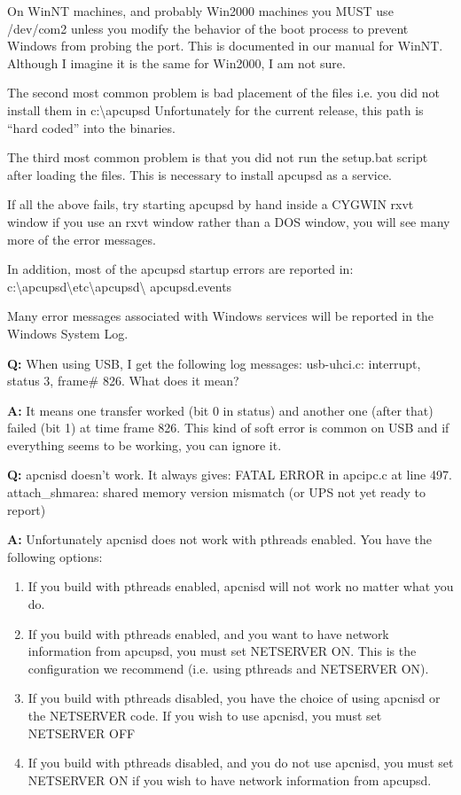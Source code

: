 {{{{{{{{{\begin{description}
{{{On WinNT machines, and probably Win2000 machines you MUST use /dev/com2 unless
you modify the behavior of the boot process to prevent Windows from probing
the port. This is documented in our manual for WinNT. Although I imagine it is
the same for Win2000, I am not sure.  

The second most common problem is bad placement of the files i.e. you did not
install them in c:\textbackslash{}apcupsd Unfortunately for the current
release, this path is ``hard coded'' into the binaries.  

The third most common problem is that you did not run the setup.bat script
after loading the files. This is necessary to install apcupsd as a service.  

If all the above fails, try starting apcupsd by hand inside a CYGWIN rxvt
window if you use an rxvt window rather than a DOS window, you will see many
more of the error messages.  

In addition, most of the apcupsd startup errors are reported in:
c:\textbackslash{}apcupsd\textbackslash{}etc\textbackslash{}apcupsd\textbackslash
{}apcupsd.events  

Many error messages associated with Windows services will be reported in the
Windows System Log.  

\item {\bf Q:}
When using USB, I get the following log messages: usb-uhci.c: interrupt,
status 3, frame\# 826. What does it mean?  

\item {\bf A:}
It means one transfer worked (bit 0 in status) and another one (after that)
failed (bit 1) at time frame 826. This kind of soft error is common on USB and
if everything seems to be working, you can ignore it.  

\item {\bf Q:}
apcnisd doesn't work. It always gives: FATAL ERROR in apcipc.c at line 497.
attach\_shmarea: shared memory version mismatch (or UPS not yet ready to
report)  

\item {\bf A:}
Unfortunately apcnisd does not work with pthreads enabled. You have the
following options:  

\begin{enumerate}
\item If you build with pthreads enabled, apcnisd will not work no matter what
you do.  
\item If you build with pthreads enabled, and you want to have network
information from apcupsd, you must set NETSERVER ON. This is the configuration
we recommend (i.e. using pthreads and NETSERVER ON).  
\item If you build with pthreads disabled, you have the choice of using
apcnisd or the NETSERVER code. If you wish to use apcnisd, you must set
NETSERVER OFF  
\item If you build with pthreads disabled, and you do not use apcnisd, you
must set NETSERVER ON if you wish to have network information from apcupsd.  
\end{enumerate}

}}}
\end{description}}}}}}}}}}
